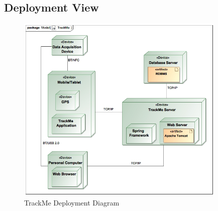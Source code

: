 \documentclass[a4paper]{article}
\begin{document}
\newpage
\subsection{Deployment View}
\begin{figure}[!htpb]
    \centering
    \includegraphics[width=100mm,keepaspectratio]{images/UML/deployment_TrackMe.jpg}
    \caption{TrackMe Deployment Diagram}
    \label{fig:deployment_trackme}
\end{figure}    
    
\newpage
\end{document}
